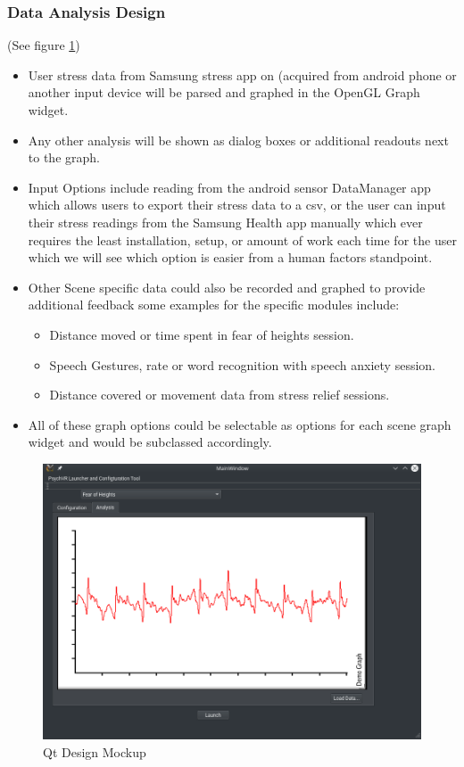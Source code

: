 \documentclass[a4paper,10pt]{article}
\begin{document}
\subsubsection{Data Analysis Design}
(See figure \ref{fig:qtMockupData})
  \begin{itemize}
  \item User stress data from Samsung stress app on (acquired from android phone or another input device will be parsed and graphed in the OpenGL Graph widget.
  \item Any other analysis will be shown as dialog boxes or additional readouts next to the graph.
  \item Input Options include reading from the android sensor DataManager app which allows users to export their stress data to a csv, or the user can input their stress readings
  from the Samsung Health app manually which ever requires the least installation, setup, or amount of work each time for the user which we will see which option is easier from a human 
  factors standpoint.
  \item Other Scene specific data could also be recorded and graphed to provide additional feedback some examples for the specific modules include:
	\begin{itemize}
	\item Distance moved or time spent in fear of heights session.
	\item Speech Gestures, rate or word recognition with speech anxiety session.
	\item Distance covered or movement data from stress relief sessions.
	\end{itemize}
\item All of these graph options could be selectable as options for each scene graph widget and would be subclassed accordingly.
  \end{itemize}
\begin{figure}[H]
				      \centerline{\includegraphics[scale = 0.35]{qtConfigData.png}}
					\caption{Qt Design Mockup}
					\label{fig:qtMockupData}
				\end{figure}
\end{document}
